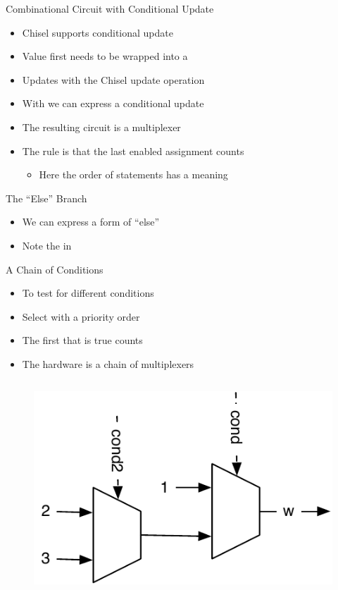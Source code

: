 \begin{frame}[fragile]{Combinational Circuit with Conditional Update}
\begin{itemize}
\item Chisel supports conditional update
\item Value first needs to be wrapped into a 
\item Updates with the Chisel update operation \code{:=}
\item With  we can express a conditional update
\item The resulting circuit is a multiplexer
\item The rule is that the last enabled assignment counts
\begin{itemize}
\item Here the order of statements has a meaning
\end{itemize}
\end{itemize}
\end{frame}

\begin{frame}[fragile]{The ``Else'' Branch}
\begin{itemize}
\item We can express a form of ``else''
\item Note the  in 
\end{itemize}
\end{frame}


\begin{frame}[fragile]{A Chain of Conditions}
\begin{itemize}
\item To test for different conditions
\item Select with a priority order
\item The first that is true counts
\item The hardware is a chain of multiplexers
\end{itemize}
\begin{columns}
\begin{figure}
  \includegraphics[scale=\scale]{../figures/mux-chain}
\end{figure}
\end{columns}
\end{frame}

